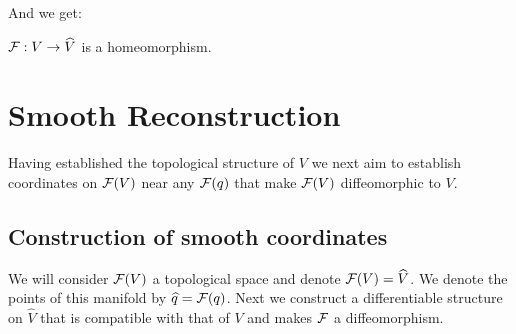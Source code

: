 

    

And we get:
\begin{corollary}\label{cor:Fhomeo}
    $\mathcal{F}:V\to \widehat{V}$ is a homeomorphism.
\end{corollary}


\section{Smooth Reconstruction}
Having established the topological structure of $V$ we next aim to establish coordinates on $\mathcal{F}(V)$ near any $\mathcal{F}(q)$ that make $\mathcal{F}(V)$ diffeomorphic to $V$.

\subsection{Construction of smooth coordinates}
We will consider ${\mathcal{F}}(V)$ a topological space and denote ${\mathcal{F}}(V)=\widehat{V}$. We denote the points of this manifold by $\widehat{q}={\mathcal{F}}(q)$. Next we construct a differentiable structure on $\widehat{V}$ that is compatible with that of $V$ and makes $\mathcal{F}$ a diffeomorphism.

